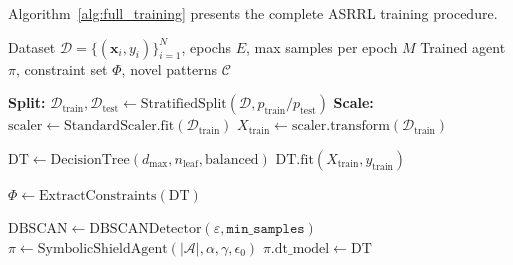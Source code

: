 \documentclass[12pt, letterpaper, oneside]{report}
\newcommand{\ASRRL}{\textsc{ASRRL}}
\newcommand{\bx}{\mathbf{x}}
\begin{document}
Algorithm~\ref{alg:full_training} presents the complete \ASRRL{} training procedure.

\begin{algorithm}[htbp]
\caption{Complete \ASRRL{} Training Procedure}
\label{alg:full_training}
\begin{algorithmic}[1]
\Require Dataset $\mathcal{D} = \{(\bx_i, y_i)\}_{i=1}^{N}$, epochs $E$, max samples per epoch $M$
\Ensure Trained agent $\pi$, constraint set $\Phi$, novel patterns $\mathcal{C}$

\State \textbf{Split:} $\mathcal{D}_{\text{train}}, \mathcal{D}_{\text{test}} \leftarrow \text{StratifiedSplit}(\mathcal{D}, p_{\text{train}}/p_{\text{test}})$
\State \textbf{Scale:} $\text{scaler} \leftarrow \text{StandardScaler.fit}(\mathcal{D}_{\text{train}})$
\State $X_{\text{train}} \leftarrow \text{scaler.transform}(\mathcal{D}_{\text{train}})$

\State {}
\State $\text{DT} \leftarrow \text{DecisionTree}(d_{\max}, n_{\text{leaf}}, \text{balanced})$
\State $\text{DT.fit}(X_{\text{train}}, y_{\text{train}})$

\State {}
\State $\Phi \leftarrow \text{ExtractConstraints}(\text{DT})$ 

\State {}
\State $\text{DBSCAN} \leftarrow \text{DBSCANDetector}(\varepsilon, \texttt{min\_samples})$
\State $\pi \leftarrow \text{SymbolicShieldAgent}(|\mathcal{A}|, \alpha, \gamma, \epsilon_0)$
\State $\pi.\text{dt\_model} \leftarrow \text{DT}$


\end{algorithmic}
\end{algorithm}
\end{document}
